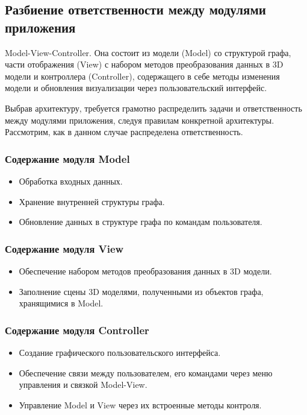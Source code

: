 \subsection{Разбиение ответственности между модулями приложения}

Model-View-Controller. Она состоит из модели (Model) со структурой графа, части отображения (View) с набором методов преобразования данных в 3D модели и контроллера (Controller), содержащего в себе методы изменения модели и обновления визуализации через пользовательский интерфейс.

Выбрав архитектуру, требуется грамотно распределить задачи и ответственность между модулями приложения, следуя правилам конкретной архитектуры. Рассмотрим, как в данном случае распределена ответственность.

\subsubsection{Содержание модуля Model}

\begin{itemize}
    \item Обработка входных данных.
    \item Хранение внутренней структуры графа.
    \item Обновление данных в структуре графа по командам пользователя.
\end{itemize}



\subsubsection{Содержание модуля View}

\begin{itemize}
    \item Обеспечение набором методов преобразования данных в 3D модели.
    \item Заполнение сцены 3D моделями, полученными из объектов графа, хранящимися в Model.
\end{itemize}



\subsubsection{Содержание модуля Controller}

\begin{itemize}
    \item Создание графического пользовательского интерфейса. 
    \item Обеспечение связи между пользователем, его командами через меню управления и связкой Model-View.
    \item Управление Model и View через их встроенные методы контроля.
\end{itemize}


